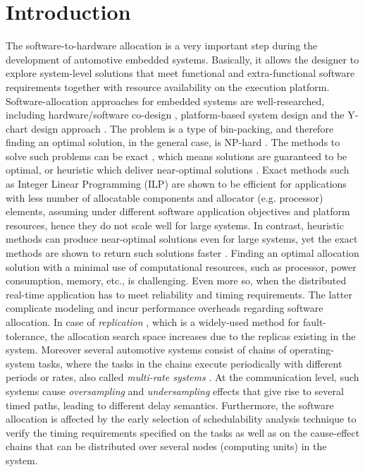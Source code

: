 \section{Introduction}
The software-to-hardware allocation is a very important step during the development of automotive embedded systems. Basically, it allows the designer to explore system-level solutions that meet functional and extra-functional software requirements together with resource availability on the execution platform. Software-allocation approaches for embedded systems are well-researched, including hardware/software co-design \cite{Wolf2003ACodesign}, platform-based system design \cite{Sangiovanni-Vincentelli2004BenefitsDesign} and the Y-chart design approach \cite{ychart_Kienhuis2002}. The problem is a type of bin-packing, and therefore finding an optimal solution, in the general case, is  NP-hard \cite{Fernandez-Baca1989AllocatingSystem}. The methods to solve such problems can be exact \cite{Saidi2015AnArchitectures}, which means solutions are guaranteed to be optimal, or heuristic which deliver near-optimal solutions \cite{faragardi2018AECUs}\cite{Bucaioni2018MoVES:Systems}. Exact methods such as Integer Linear Programming (ILP) \cite{Bradley1977AppliedProgramming} are shown to be efficient for applications with less number of allocatable components and allocator (e.g. processor) elements, assuming under different software application objectives and platform resources, hence they do not scale well for large systems. In contrast, heuristic methods can produce near-optimal solutions even for large systems, yet the exact methods are shown to return such solutions faster \cite{Wozniak2013AnArchitectures}. 
Finding an optimal allocation solution with a minimal use of computational resources, such as processor, power consumption, memory, etc., is challenging. Even more so, when the distributed real-time application has to meet reliability and timing requirements. The latter complicate modeling and incur performance overheads regarding software allocation. In case of \textit{replication} \cite{Kopetz1989DistributedApproach}, which is a widely-used method for fault-tolerance, the allocation search space increases due to the replicas existing in the system. Moreover several automotive systems consist of chains of operating-system tasks, where the tasks in the chains execute periodically with different periods or rates, also called \textit{multi-rate systems} \cite{Wolf2012ComputersComponents}. At the communication level, such systems cause \textit{oversampling} and \textit{undersampling} effects that give rise to several timed paths, leading to different delay semantics. Furthermore, the software allocation is affected by the early selection of schedulability analysis technique to verify the timing requirements specified on the tasks as well as on the cause-effect chains that can be distributed over several nodes (computing units) in the system. 

